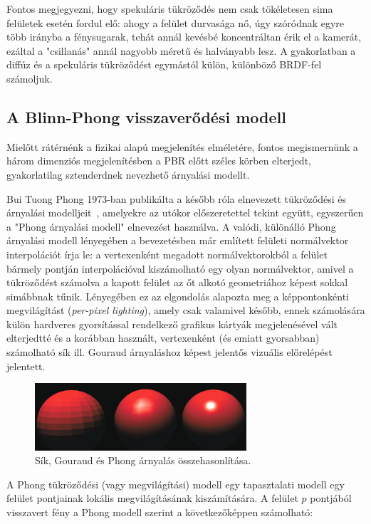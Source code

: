 Fontos megjegyezni, hogy spekuláris tükröződés nem csak tökéletesen sima felületek esetén fordul elő: ahogy a felület durvasága nő, úgy szóródnak egyre több irányba a fénysugarak, tehát annál kevésbé koncentráltan érik el a kamerát, ezáltal a "csillanás" annál nagyobb méretű és halványabb lesz. A gyakorlatban a diffúz és a spekuláris tükröződést egymástól külön, különböző BRDF-fel számoljuk.

\subsection{A Blinn-Phong visszaverődési modell}

Mielőtt rátérnénk a fizikai alapú megjelenítés elméletére, fontos megismernünk a három dimenziós megjelenítésben a PBR előtt széles körben elterjedt, gyakorlatilag sztenderdnek nevezhető árnyalási modellt.

Bui Tuong Phong 1973-ban publikálta a később róla elnevezett tükröződési és árnyalási modelljeit~\cite{phong1975illumination}, amelyekre az utókor előszeretettel tekint együtt, egyszerűen a "Phong árnyalási modell" elnevezést használva. A valódi, különálló Phong árnyalási modell lényegében a bevezetésben már említett felületi normálvektor interpolációt írja le: a vertexenként megadott normálvektorokból a felület bármely pontján interpolációval kiszámolható egy olyan normálvektor, amivel a tükröződést számolva a kapott felület az őt alkotó geometriához képest sokkal simábbnak tűnik. Lényegében ez az elgondolás alapozta meg a képpontonkénti megvilágítást (\textit{per-pixel lighting}), amely csak valamivel később, ennek számolására külön hardveres gyorsítással rendelkező grafikus kártyák megjelenésével vált elterjedtté és a korábban használt, vertexenként (és emiatt gyorsabban) számolható sík ill. Gouraud árnyaláshoz képest jelentős vizuális előrelépést jelentett.

\begin{figure}[!ht]
    \centering
    \includegraphics[width=0.7\textwidth]{images/flat_gouraud_phong.png}
    \caption{Sík, Gouraud és Phong árnyalás összehasonlítása. }
\end{figure}

A Phong tükröződési (vagy megvilágítási) modell egy tapasztalati modell egy felület pontjainak lokális megvilágításának kiszámítására. A felület \(p\) pontjából visszavert fény a Phong modell szerint a következőképpen számolható:

